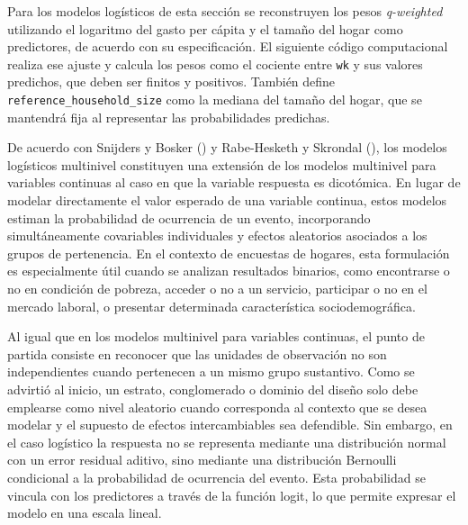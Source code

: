 \documentclass[
  spanish,
  11pt,
  letterpaper,
  oneside,
  open=any]{scrbook}
\newenvironment{Shaded}{\begin{snugshade}}{\end{snugshade}}
\newcommand{\AttributeTok}[1]{\textcolor[rgb]{0.40,0.45,0.13}{#1}}
\newcommand{\FunctionTok}[1]{\textcolor[rgb]{0.28,0.35,0.67}{#1}}
\newcommand{\NormalTok}[1]{\textcolor[rgb]{0.00,0.23,0.31}{#1}}
\newcommand{\OtherTok}[1]{\textcolor[rgb]{0.00,0.23,0.31}{#1}}
\newcommand{\SpecialCharTok}[1]{\textcolor[rgb]{0.37,0.37,0.37}{#1}}
\begin{document}
Para los modelos logísticos de esta sección se reconstruyen los pesos
\emph{q-weighted} utilizando el logaritmo del gasto per cápita y el
tamaño del hogar como predictores, de acuerdo con su especificación. El
siguiente código computacional realiza ese ajuste y calcula los pesos
como el cociente entre \texttt{wk} y sus valores predichos, que deben
ser finitos y positivos. También define
\texttt{reference\_household\_size} como la mediana del tamaño del
hogar, que se mantendrá fija al representar las probabilidades
predichas.

\begin{Shaded}
\end{Shaded}

De acuerdo con Snijders y Bosker () y
Rabe-Hesketh y Skrondal
(), los modelos logísticos
multinivel constituyen una extensión de los modelos multinivel para
variables continuas al caso en que la variable respuesta es dicotómica.
En lugar de modelar directamente el valor esperado de una variable
continua, estos modelos estiman la probabilidad de ocurrencia de un
evento, incorporando simultáneamente covariables individuales y efectos
aleatorios asociados a los grupos de pertenencia. En el contexto de
encuestas de hogares, esta formulación es especialmente útil cuando se
analizan resultados binarios, como encontrarse o no en condición de
pobreza, acceder o no a un servicio, participar o no en el mercado
laboral, o presentar determinada característica sociodemográfica.

Al igual que en los modelos multinivel para variables continuas, el
punto de partida consiste en reconocer que las unidades de observación
no son independientes cuando pertenecen a un mismo grupo sustantivo.
Como se advirtió al inicio, un estrato, conglomerado o dominio del
diseño solo debe emplearse como nivel aleatorio cuando corresponda al
contexto que se desea modelar y el supuesto de efectos intercambiables
sea defendible. Sin embargo, en el caso logístico la respuesta no se
representa mediante una distribución normal con un error residual
aditivo, sino mediante una distribución Bernoulli condicional a la
probabilidad de ocurrencia del evento. Esta probabilidad se vincula con
los predictores a través de la función logit, lo que permite expresar el
modelo en una escala lineal.
\end{document}
